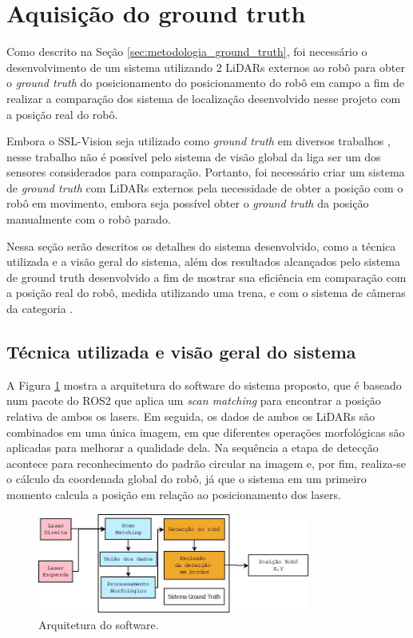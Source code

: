 \documentclass[acronym, symbols, table, deposito]{fei}
\begin{document}
		\section{Aquisição do ground truth} \label{sec:resultados_ground_truth}
		
			Como descrito na Seção \ref{sec:metodologia_ground_truth}, foi necessário o desenvolvimento de um sistema utilizando 2 LiDARs externos ao robô para obter o \textit{ground truth} do posicionamento do posicionamento do robô em campo a fim de realizar a comparação dos sistema de localização desenvolvido nesse projeto com a posição real do robô. 
			
			Embora o SSL-Vision seja utilizado como \textit{ground truth} em diversos trabalhos \cite{9018557, melo2022embedded}, nesse trabalho não é possível pelo sistema de visão global da liga ser um dos sensores considerados para comparação. Portanto, foi necessário criar um sistema de \textit{ground truth} com LiDARs externos pela necessidade de obter a posição com o robô em movimento, embora seja possível obter o \textit{ground truth} da posição manualmente com o robô parado.
			
			Nessa seção serão descritos os detalhes do sistema desenvolvido, como a técnica utilizada e a visão geral do sistema, além dos resultados alcançados pelo sistema de ground truth desenvolvido a fim de mostrar sua eficiência em comparação com a posição real do robô, medida utilizando uma trena, e com o sistema de câmeras da categoria .
		
			\subsection{Técnica utilizada e visão geral do sistema}
				
				A Figura \ref{fig:software_architecture} mostra a arquitetura do software do sistema proposto, que é baseado num pacote do ROS2 que aplica um \textit{scan matching} para encontrar a posição relativa de ambos os lasers. Em seguida, os dados de ambos os LiDARs são combinados em uma única imagem, em que diferentes operações morfológicas são aplicadas para melhorar a qualidade dela. Na sequência a etapa de detecção acontece para reconhecimento do padrão circular na imagem e, por fim, realiza-se o cálculo da coordenada global do robô, já que o sistema em um primeiro momento calcula a posição em relação ao posicionamento dos lasers.
					
				\begin{figure}[!htb]
					\centering
					\includegraphics[width=0.80\textwidth]{software_architecture.jpeg}
					\caption{Arquitetura do software.} \label{fig:software_architecture}
				\end{figure}
			
\end{document}
